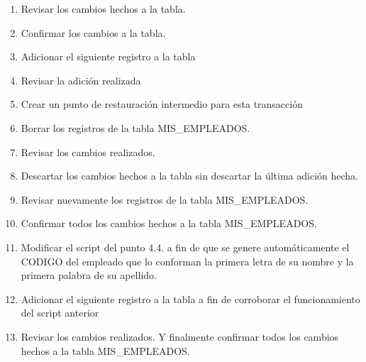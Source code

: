 \begin{enumerate}[1.]
	\item Revisar los cambios hechos a la tabla.
	\item Confirmar los cambios a la tabla.
	\item Adicionar el siguiente registro a la tabla
	\item Revisar la adición realizada
	\item Crear un punto de restauración intermedio para esta transacción
	\item Borrar los registros de la tabla MIS\_EMPLEADOS.
	\item Revisar los cambios realizados.
	\item Descartar los cambios hechos a la tabla sin descartar la última adición hecha.
	\item Revisar nuevamente los registros de la tabla MIS\_EMPLEADOS.
	\item Confirmar todos los cambios hechos a la tabla MIS\_EMPLEADOS.
	\item Modificar el script del punto 4.4. a fin de que se genere automáticamente el CODIGO del empleado que lo conforman la primera letra de su nombre y la primera palabra de su apellido.
	\item Adicionar el siguiente registro a la tabla a fin de corroborar el funcionamiento del script anterior
	\item Revisar los cambios realizados. Y finalmente confirmar todos los cambios hechos a la tabla MIS\_EMPLEADOS.

\end{enumerate} 